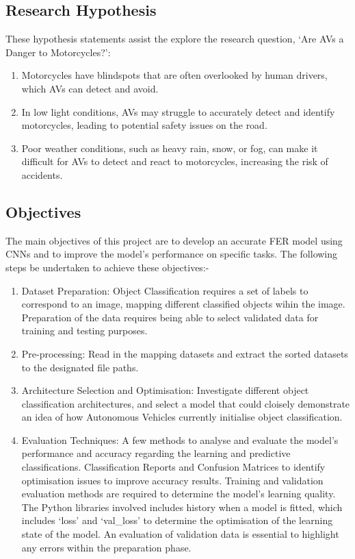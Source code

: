 \documentclass[conference]{IEEEtran}
\begin{document}
	\subsection{Research Hypothesis}
		These hypothesis statements assist the explore the research question, `Are AVs a Danger to Motorcycles?':

		\begin{enumerate}
		\item Motorcycles have blindspots that are often overlooked by human drivers, which AVs can detect and avoid.
		\item In low light conditions, AVs may struggle to accurately detect and identify motorcycles, leading to potential safety issues on the road.
		\item Poor weather conditions, such as heavy rain, snow, or fog, can make it difficult for AVs to detect and react to motorcycles, increasing the risk of accidents.
		\end{enumerate}

	\subsection{Objectives}
	The main objectives of this project are to develop an accurate FER model using CNNs and to improve the model's performance on specific tasks. The following steps be undertaken to achieve these objectives:-

	\begin{enumerate}
		\item Dataset Preparation: Object Classification requires a set of labels to correspond to an image, mapping different classified objects wihin the image. Preparation of the data requires being able to select validated data for training and testing purposes.
		\item Pre-processing: Read in the mapping datasets and extract the sorted datasets to the designated file paths. 
		\item Architecture Selection and Optimisation: Investigate different object classification architectures, and select a model that could cloisely demonstrate an idea of how Autonomous Vehicles currently initialise object classification.
		\item Evaluation Techniques: A few methods to analyse and evaluate the model's performance and accuracy regarding the learning and predictive classifications. Classification Reports and Confusion Matrices to identify optimisation issues to improve accuracy results. Training and validation evaluation methods are required to determine the model's learning quality. The Python libraries involved includes history when a model is fitted, which includes `loss' and `val\_loss' to determine the optimisation of the learning state of the model. An evaluation of validation data is essential to highlight any errors within the preparation phase.
	\end{enumerate}
\end{document}
